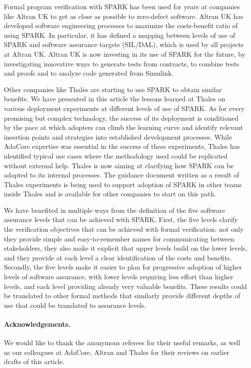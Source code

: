 \documentclass{eceasst}
\begin{document}
Formal program verification with SPARK has been used for years at companies
like Altran UK to get as close as possible to zero-defect software. Altran UK
has developed software engineering processes to maximize the costs-benefit
ratio of using SPARK. In particular, it has defined a mapping between levels of
use of SPARK and software assurance targets (SIL/DAL), which is used by all
projects at Altran UK. Altran UK is now investing in its use of SPARK for the
future, by investigating innovative ways to generate tests from contracts, to
combine tests and proofs and to analyze code generated from Simulink.

Other companies like Thales are starting to use SPARK to obtain similar
benefits. We have presented in this article the lessons learned at Thales on
various deployment experiments at different levels of use of SPARK. As for
every promising but complex technology, the success of its deployment is
conditioned by the pace at which adopters can climb the learning curve and
identify relevant insertion points and strategies into established development
processes. While AdaCore expertise was essential in the success of these
experiments, Thales has identified typical use cases where the methodology used
could be replicated without external help. Thales is now aiming at clarifying
how SPARK can be adapted to its internal processes. The guidance document
written as a result of Thales experiments is being used to support adoption of
SPARK in other teams inside Thales and is available for other companies to
start on this path.

We have benefited in multiple ways from the definition of the five software
assurance levels that can be achieved with SPARK. First, the five levels
clarify the verification objectives that can be achieved with formal
verification: not only they provide simple and easy-to-remember names for
communicating between stakeholders, they also make it explicit that upper
levels build on the lower levels, and they provide at each level a clear
identification of the costs and benefits. Secondly, the five levels make it
easier to plan for progressive adoption of higher levels of software assurance,
with lower levels requiring less effort than higher levels, and each level
providing already very valuable benefits. These results could be translated to
other formal methods that similarly provide different depths of use that could
be translated to assurance levels.

\paragraph*{Acknowledgements.}

We would like to thank the anonymous referees for their useful remarks, as well
as our colleagues at AdaCore, Altran and Thales for their reviews on earlier
drafts of this article.



\end{document}
